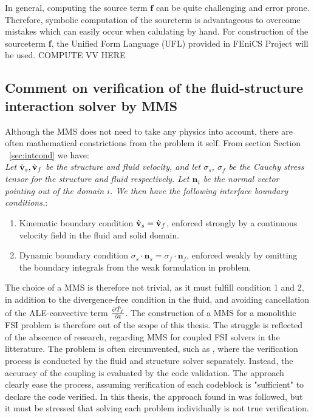 In general, computing the source term $\mathbf{f}$ can be quite challenging and error prone.  Therefore, symbolic computation of the sourcterm is advantageous to overcome mistakes which can easily occur when calulating by hand. For construction of the sourceterm \textbf{f}, the Unified Form Language (UFL) \cite{Alnes2015} provided in FEniCS Project will be used. COMPUTE VV HERE

\subsection{Comment on verification of the fluid-structure interaction solver by MMS}
Although the MMS does not need to take any physics into account, there are often mathematical constrictions from the problem it self. From section Section ~\ref{sec:intcond} we have: \\

\textit{Let $\hat{\mathbf{v}}_s, \hat{\mathbf{v}}_f$ be the structure and fluid velocity, and let $\sigma_s$, $\sigma_f$ be the Cauchy stress tensor for the structure and fluid respectively. Let $\mathbf{n}_i$ be the normal vector pointing out of the domain $i$. We then have the following interface boundary conditions.}:
\begin{enumerate}
\item Kinematic boundary condition $\hat{\mathbf{v}}_s = \hat{\mathbf{v}}_f$, enforced strongly by a continuous velocity field in the fluid
        and solid domain.
\item Dynamic boundary condition $\sigma_s \cdot \mathbf{n}_s = \sigma_f \cdot \mathbf{n}_f$, enforced weakly by omitting the 
        boundary integrals from the weak formulation in problem.
\end{enumerate}
The choice of a MMS is therefore not trivial, as it must fulfill condition 1 and 2, in addition to the divergence-free condition in the fluid, and avoiding cancellation of the ALE-convective term $\frac{\partial \hat{T}_f}{\partial t}$.  The construction of a MMS for a monolithic FSI problem is therefore out of the scope of this thesis. The struggle is reflected of the abscence of research, regarding MMS for coupled FSI solvers in the litterature. The problem is often circumvented, such as \cite{Sheldon2014}, where the verification process is conducted by the fluid and structure solver separately. Instead, the accuracy of the coupling is evaluated by the code validation. The approach clearly ease the process, assuming verification of each codeblock is "sufficient" to declare the code verified. In this thesis, the approach found in \cite{Sheldon2014} was followed, but it must be stressed that solving each problem individually is not true verification.

